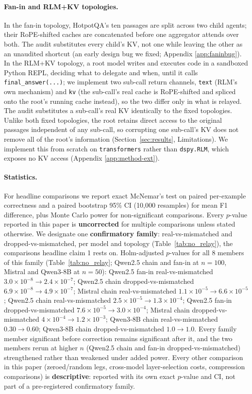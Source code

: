 \documentclass[11pt]{article}
\begin{document}
\paragraph{Fan-in and RLM+KV topologies.} In the fan-in topology,
HotpotQA's ten passages are split across two child agents; their
RoPE-shifted caches are concatenated before one aggregator attends over
both. The audit substitutes every child's KV, not one while leaving the
other as an unaudited shortcut (an early design bug we fixed; Appendix
\ref{app:faninbug}). In the RLM+KV topology, a root model writes and
executes code in a sandboxed Python REPL, deciding what to delegate and
when, until it calls \texttt{final\_answer(...)}; we implement two
sub-call return channels, \texttt{text} (RLM's own mechanism) and
\texttt{kv} (the sub-call's real cache is RoPE-shifted and spliced onto
the root's running cache instead), so the two differ only in what is
relayed. The audit substitutes a sub-call's real KV identically to the
fixed topologies. Unlike both fixed topologies, the root retains direct
access to the original passages independent of any sub-call, so
corrupting one sub-call's KV does not remove all of the root's
information (Section~\ref{sec:results}, Limitations). We implement this
from scratch on \texttt{transformers} \citep{transformers2020} rather
than \texttt{dspy.RLM}, which exposes no KV access (Appendix
\ref{app:method-ext}).

\paragraph{Statistics.} For headline comparisons we report exact
McNemar's test on paired per-example correctness and a paired bootstrap
95\% CI (10,000 resamples) for mean F1 difference, plus Monte Carlo
power for non-significant comparisons. Every $p$-value reported in this
paper is \textbf{uncorrected} for multiple comparisons unless stated
otherwise. We designate one \textbf{confirmatory family}:
real-vs-mismatched and dropped-vs-mismatched, per model and topology
(Table~\ref{tab:no_relay}), the comparisons headline claim 1 rests on.
Holm-adjusted $p$-values for all 8 members of this family
(Table~\ref{tab:no_relay}; Qwen2.5 chain and fan-in at $n=100$, Mistral
and Qwen3-8B at $n=50$): Qwen2.5 fan-in real-vs-mismatched
$3.0\times10^{-8} \to 2.4\times10^{-7}$; Qwen2.5 chain
dropped-vs-mismatched $6.9\times10^{-8} \to 4.9\times10^{-7}$; Mistral
chain real-vs-mismatched $1.1\times10^{-5} \to 6.6\times10^{-5}$;
Qwen2.5 chain real-vs-mismatched $2.5\times10^{-5} \to 1.3\times10^{-4}$;
Qwen2.5 fan-in dropped-vs-mismatched $7.6\times10^{-5} \to
3.0\times10^{-4}$; Mistral chain dropped-vs-mismatched $4\times10^{-4}
\to 1.2\times10^{-3}$; Qwen3-8B chain real-vs-mismatched $0.30 \to
0.60$; Qwen3-8B chain dropped-vs-mismatched $1.0 \to 1.0$. Every family
member significant before correction remains significant after it, and
the two members rerun at higher $n$ (Qwen2.5 chain and fan-in
dropped-vs-mismatched) strengthened rather than weakened under added
power. Every other comparison in this paper (zeroed/random legs,
cross-model layer-selection costs, compression comparisons) is
\textbf{descriptive}: reported with its own exact $p$-value and CI, not
part of a pre-registered confirmatory family.
\end{document}
